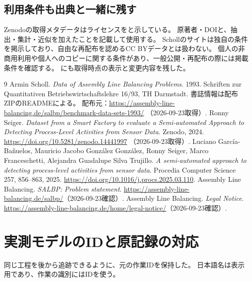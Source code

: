 \documentclass[a4paper,11pt]{ltjsarticle}
\DeclareRobustCommand{\code}[1]{\texttt{\detokenize{#1}}}
\begin{document}
\subsection{利用条件も出典と一緒に残す}
Zenodoの取得メタデータはライセンスを\code{cc-by-4.0}と示している。
原著者・DOIと、抽出・集計・近似を加えたことを記載して使用する。
Schollのサイトは独自の条件を掲示しており、自由な再配布を認めるCC BYデータとは扱わない\cite{notice}。
個人の非商用利用や個人へのコピーに関する条件があり、一般公開・再配布の際には掲載条件を確認する。
\code{SOURCE_NOTICES.md}にも取得時点の表示と変更内容を残した。

\begingroup\small
\begin{thebibliography}{9}
\setlength{\itemsep}{.15em}
Armin Scholl. \emph{Data of Assembly Line Balancing Problems}. 1993.
Schriften zur Quantitativen Betriebswirtschaftslehre 16/93, TH Darmstadt.
書誌情報は配布ZIPのREADMEによる。
配布元：\url{https://assembly-line-balancing.de/salbp/benchmark-data-sets-1993/}
（2026-09-23取得）.
Ronny Seiger. \emph{Dataset from a Smart Factory to evaluate a Semi-automated Approach to Detecting Process-Level Activities from Sensor Data}. Zenodo, 2024.
\url{https://doi.org/10.5281/zenodo.14441997}
（2026-09-23取得）.
Luciano García-Bañuelos, Mauricio Jacobo González González, Ronny Seiger,
Marco Franceschetti, Alejandra Guadalupe Silva Trujillo.
\emph{A semi-automated approach to detecting process-level activities from sensor data}.
Procedia Computer Science 257, 856--863, 2025.
\url{https://doi.org/10.1016/j.procs.2025.03.110}.
Assembly Line Balancing. \emph{SALBP: Problem statement}.
\url{https://assembly-line-balancing.de/salbp/}（2026-09-23確認）.
Assembly Line Balancing. \emph{Legal Notice}.
\url{https://assembly-line-balancing.de/home/legal-notice/}（2026-09-23確認）.
\end{thebibliography}
\endgroup

\clearpage
\appendix
\section{実測モデルのIDと原記録の対応}
同じ工程を後から追跡できるように、元の作業IDを保持した。
日本語名は表示用であり、作業の識別にはIDを使う。
\end{document}
